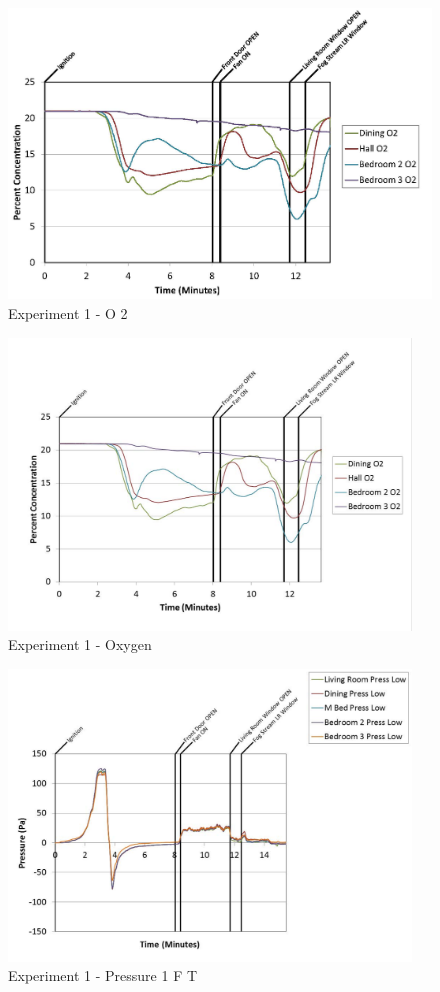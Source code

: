 \documentclass{article}
\begin{document}
\begin{appendices}
	\clearpage

	\begin{figure}[h!]
		\centering
		\includegraphics[height=3.05in]{0_Images/Results_Charts/Exp_1_Charts/O2.pdf}
		\caption{Experiment 1 - O 2}
	\end{figure}
 

	\begin{figure}[h!]
		\centering
		\includegraphics[height=3.05in]{0_Images/Results_Charts/Exp_1_Charts/Oxygen.pdf}
		\caption{Experiment 1 - Oxygen}
	\end{figure}
 
	\clearpage

	\begin{figure}[h!]
		\centering
		\includegraphics[height=3.05in]{0_Images/Results_Charts/Exp_1_Charts/Pressure1FT.pdf}
		\caption{Experiment 1 - Pressure 1 F T}
	\end{figure}
 


\end{appendices}
\end{document}
